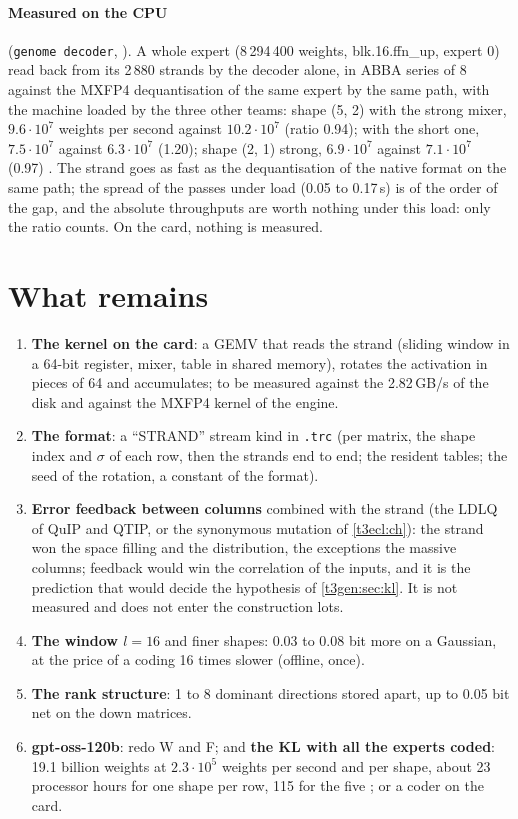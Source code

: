\paragraph{Measured on the CPU} (\texttt{genome decoder}, ). A whole expert (8\,294\,400 weights, blk.16.ffn\_up, expert 0) read back from its 2\,880 strands by the decoder alone, in ABBA series of 8 against the MXFP4 dequantisation of the same expert by the same path, with the machine loaded by the three other teams: shape (5, 2) with the strong mixer, $9.6\cdot10^7$ weights per second against $10.2\cdot10^7$ (ratio 0.94); with the short one, $7.5\cdot10^7$ against $6.3\cdot10^7$ (1.20); shape (2, 1) strong, $6.9\cdot10^7$ against $7.1\cdot10^7$ (0.97) \mes. The strand goes as fast as the dequantisation of the native format on the same path; the spread of the passes under load (0.05 to 0.17\,s) is of the order of the gap, and the absolute throughputs are worth nothing under this load: only the ratio counts. On the card, nothing is measured.

\section{What remains}\label{t3gen:sec:reste}

\begin{enumerate}
\item \textbf{The kernel on the card}: a GEMV that reads the strand (sliding window in a 64-bit register, mixer, table in shared memory), rotates the activation in pieces of 64 and accumulates; to be measured against the 2.82\,GB/s of the disk and against the MXFP4 kernel of the engine.
\item \textbf{The format}: a ``STRAND'' stream kind in \texttt{.trc} (per matrix, the shape index and $\sigma$ of each row, then the strands end to end; the resident tables; the seed of the rotation, a constant of the format).
\item \textbf{Error feedback between columns} combined with the strand (the LDLQ of QuIP and QTIP, or the synonymous mutation of \cref{t3ecl:ch}): the strand won the space filling and the distribution, the exceptions the massive columns; feedback would win the correlation of the inputs, and it is the prediction that would decide the hypothesis of \cref{t3gen:sec:kl}. It is not measured and does not enter the construction lots.
\item \textbf{The window $l = 16$} and finer shapes: 0.03 to 0.08 bit more on a Gaussian, at the price of a coding 16 times slower (offline, once).
\item \textbf{The rank structure}: 1 to 8 dominant directions stored apart, up to 0.05 bit net on the down matrices.
\item \textbf{gpt-oss-120b}: redo W and F; and \textbf{the KL with all the experts coded}: 19.1 billion weights at $2.3\cdot10^5$ weights per second and per shape, about 23 processor hours for one shape per row, 115 for the five \calc; or a coder on the card.
\end{enumerate}

